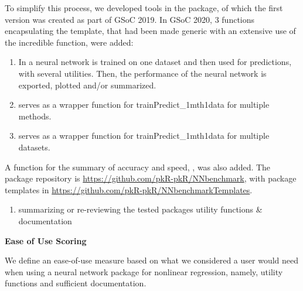 To simplify this process, we developed tools in the 
package, of which the first version was created as part of GSoC 2019. In
GSoC 2020, 3 functions encapsulating the template, that had been made
generic with an extensive use of the incredible  function,
were added:

\begin{enumerate}
\def\labelenumi{\arabic{enumi}.}
\tightlist
\item
  In  a neural network is trained on one
  dataset and then used for predictions, with several utilities. Then,
  the performance of the neural network is exported, plotted and/or
  summarized.
\item
   serves as a wrapper function for
  trainPredict\_1mth1data for multiple methods.
\item
   serves as a wrapper function for
  trainPredict\_1mth1data for multiple datasets.
\end{enumerate}

A function for the summary of accuracy and speed, , was
also added. The package repository is
\url{https://github.com/pkR-pkR/NNbenchmark}, with package templates in
\url{https://github.com/pkR-pkR/NNbenchmarkTemplates}.

\begin{enumerate}
\def\labelenumi{\arabic{enumi}.}
\setcounter{enumi}{2}
\tightlist
\item
  summarizing or re-reviewing the tested packages utility functions \&
  documentation
\end{enumerate}

\textbf{Ease of Use Scoring}

We define an ease-of-use measure based on what we considered a user
would need when using a neural network package for nonlinear regression,
namely, utility functions and sufficient documentation.

